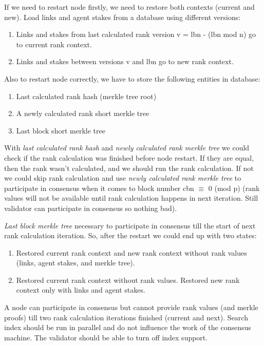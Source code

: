 \documentclass[8pt,oneside]{amsart}
\newcommand{\code}[1]{{\PlayBold #1}}
\begin{document}
If we need to restart node firstly, we need to restore both contexts (current and new).
Load links and agent stakes from a database using different versions:

\begin{enumerate}
  \item Links and stakes from last calculated rank version \code{v = lbn - (lbn mod n)} go to current rank context.
  \item Links and stakes between versions \code{v} and \code{lbn} go to new rank context.
\end{enumerate}

Also to restart node correctly, we have to store the following entities in database:

\begin{enumerate}
  \item Last calculated rank hash (merkle tree root)
  \item A newly calculated rank short merkle tree
  \item Last block short merkle tree
\end{enumerate}

With \textit{last calculated rank hash} and \textit{newly calculated rank merkle tree} we could check if the rank
calculation was finished before node restart. If they are equal, then the rank wasn't calculated, and we should run the rank calculation.
 If not we could skip rank calculation and use \textit{newly calculated rank merkle tree} to participate in consensus when it comes to block number \code{cbn $\equiv$ 0 (mod p)} (rank values will not be available until rank calculation happens in next iteration. Still validator can participate in consensus so nothing bad).

\textit{Last block merkle tree} necessary to participate in consensus till the start of next rank calculation iteration. So, after the restart we could end up with two states:

\begin{enumerate}
\item Restored current rank context and new rank context without rank values (links, agent stakes, and merkle tree).
\item Restored current rank context without rank values. Restored new rank context only with links and agent stakes.
\end{enumerate}

A node can participate in consensus but cannot provide rank values (and merkle proofs) till two rank calculation iterations finished (current and next). Search index should be run in parallel and do not influence the work of the consensus machine. The validator should be able to turn off index support.
\end{document}
